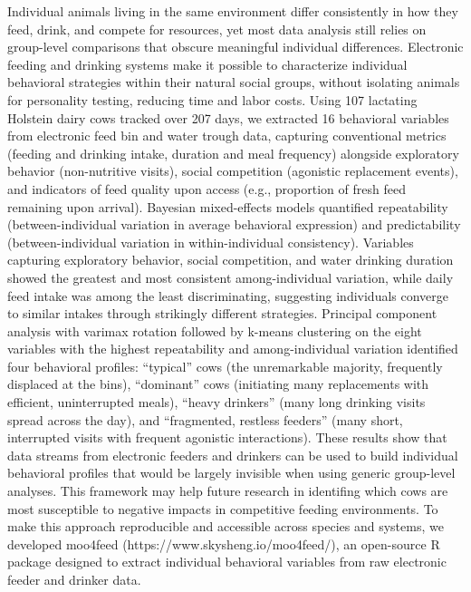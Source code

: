 \documentclass[
]{article}
\begin{document}
Individual animals living in the same environment differ consistently in
how they feed, drink, and compete for resources, yet most data analysis
still relies on group-level comparisons that obscure meaningful
individual differences. Electronic feeding and drinking systems make it
possible to characterize individual behavioral strategies within their
natural social groups, without isolating animals for personality
testing, reducing time and labor costs. Using 107 lactating Holstein
dairy cows tracked over 207 days, we extracted 16 behavioral variables
from electronic feed bin and water trough data, capturing conventional
metrics (feeding and drinking intake, duration and meal frequency)
alongside exploratory behavior (non-nutritive visits), social
competition (agonistic replacement events), and indicators of feed
quality upon access (e.g., proportion of fresh feed remaining upon
arrival). Bayesian mixed-effects models quantified repeatability
(between-individual variation in average behavioral expression) and
predictability (between-individual variation in within-individual
consistency). Variables capturing exploratory behavior, social
competition, and water drinking duration showed the greatest and most
consistent among-individual variation, while daily feed intake was among
the least discriminating, suggesting individuals converge to similar
intakes through strikingly different strategies. Principal component
analysis with varimax rotation followed by k-means clustering on the
eight variables with the highest repeatability and among-individual
variation identified four behavioral profiles: ``typical'' cows (the
unremarkable majority, frequently displaced at the bins), ``dominant''
cows (initiating many replacements with efficient, uninterrupted meals),
``heavy drinkers'' (many long drinking visits spread across the day),
and ``fragmented, restless feeders'' (many short, interrupted visits
with frequent agonistic interactions). These results show that data
streams from electronic feeders and drinkers can be used to build
individual behavioral profiles that would be largely invisible when
using generic group-level analyses. This framework may help future
research in identifing which cows are most susceptible to negative
impacts in competitive feeding environments. To make this approach
reproducible and accessible across species and systems, we developed
moo4feed (https://www.skysheng.io/moo4feed/), an open-source R package
designed to extract individual behavioral variables from raw electronic
feeder and drinker data.
\end{document}
